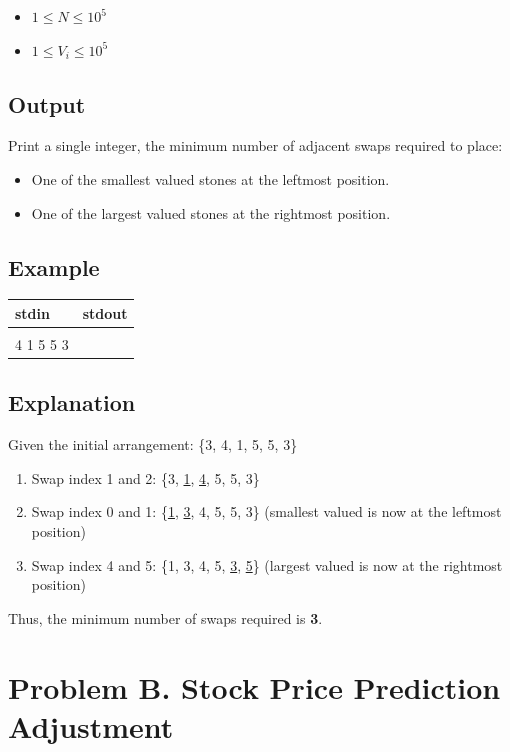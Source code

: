 \documentclass[12pt,a4paper]{article}
\begin{document}
\begin{itemize}
    \item $1 \leq N \leq 10^5$
    \item $1 \leq V_i \leq 10^5$
\end{itemize}

\subsection*{\fontsize{16}{12}Output}
Print a single integer, the minimum number of adjacent swaps required to place:
\begin{itemize}
    \item One of the smallest valued stones at the leftmost position.
    \item One of the largest valued stones at the rightmost position.
\end{itemize}

\newpage
\subsection*{\fontsize{16}{12}Example}
\begin{table}[h]
  \centering
  \begin{tabularx}{\textwidth}{|>{\ttfamily}X|>{\ttfamily}X|}
  \hline
  stdin & stdout \\
  \hline
    6 & 3 \\
    3 4 1 5 5 3 & \\
  \hline
  \end{tabularx}
\end{table}

\subsection*{\fontsize{16}{12}Explanation}
Given the initial arrangement: \{3, 4, 1, 5, 5, 3\}

\begin{enumerate}
    \item Swap index 1 and 2: \{3, \underline{1}, \underline{4}, 5, 5, 3\}
    \item Swap index 0 and 1: \{\underline{1}, \underline{3}, 4, 5, 5, 3\} (smallest valued is now at the leftmost position)
    \item Swap index 4 and 5: \{1, 3, 4, 5, \underline{3}, \underline{5}\} (largest valued is now at the rightmost position)
\end{enumerate}
Thus, the minimum number of swaps required is \textbf{3}.
\newpage
\section*{\fontsize{18}{12}Problem B. Stock Price Prediction Adjustment}
\end{document}
